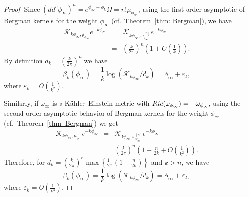 \documentclass[a4paper, 11pt]{amsart}
\theoremstyle{plain}
\numberwithin{equation}{section} %
\numberwithin{figure}{section} %
\theoremstyle{plain}
\theoremstyle{plain}
\theoremstyle{plain}
\theoremstyle{plain}
\theoremstyle{remark}
\theoremstyle{definition}
\theoremstyle{definition}
\newcommand{\K}{\mathcal{K}}
\begin{document}
\begin{proof}
Since $ (dd^c\phi_{\infty})^n=e^{\phi_{\infty} -\phi_L}\Omega=n! \mu_{\phi_\infty}$, using the first order asymptotic of  Bergman kernels for the weight $\phi_{\infty}$ (cf.~Theorem~\ref{thm: Bergman}), we have
\begin{eqnarray*}
\K_{k\phi_{\infty}, \mu_{\phi_\infty}}e^{-k \phi_{\infty}}  &=&\K_{k\phi_{\infty},\omega_{\phi_{\infty}}^{[n]}}e^{-k \phi_{\infty}} \\
&=&\left(\frac{k  }{2\pi}\right)^n \left(1+O\left(\frac{1}{k}\right)\right).
\end{eqnarray*}  
By definition
$d_k= \left(\frac{k  }{2\pi}\right)^n$ we have
\begin{equation}\label{est_kernel}
\beta_k(\phi_{\infty})= \frac{1}{k}\log(\K_{k\phi_{\infty
}}/d_k)= \phi_{\infty} + \varepsilon_k,
\end{equation} 
where  $\varepsilon_k =O(\frac{1}{k^2})$. 

Similarly, if $\omega_\infty$ is a K\"ahler--Einstein metric with ${\rm Ric} (\omega_{\phi_\infty})=-\omega_{\phi_\infty}$, using the second-order asymptotic behavior of  Bergman kernels for the weight $\phi_{\infty}$ (cf.~Theorem~\ref{thm: Bergman}) we get
\begin{eqnarray*}
\K_{k\phi_{\infty}, \mu_{\phi_\infty}}e^{-k \phi_{\infty}}  &=&\K_{k\phi_{\infty},\omega_{\phi_{\infty}}^{[n]}}e^{-k \phi_{\infty}} \\
&=&\left(\frac{k  }{2\pi}\right)^n \left(1-\frac{n}{2k} + O\left(\frac{1}{k^2}\right)\right).
\end{eqnarray*}  
Therefore, for $d_k= \left(\frac{k  }{2\pi}\right)^n\max\left\{\frac{1}{2}, ( 1-\frac{n}{2k})\right\}$ and $k>n$, we have
\begin{equation}\label{est_kernel_KE}
\beta_k(\phi_{\infty})= \frac{1}{k}\log(\K_{k\phi_{\infty
}}/d_k)=\phi_{\infty}+ \varepsilon_k,
\end{equation} 
where $\varepsilon_k= O(\frac{1}{k^3}).$


\end{proof}
\end{document}
